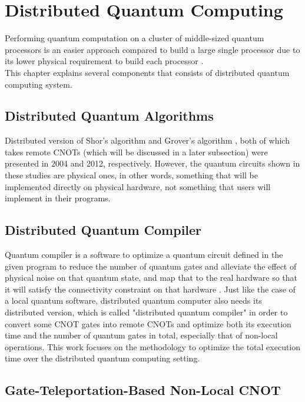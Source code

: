 \newpage

\section{Distributed Quantum Computing}
 
  Performing quantum computation on a cluster of middle-sized quantum processors is an easier approach compared to build a large single processor due to its lower physical requirement to build each processor \cite{distributedquantumcomputing}.  \\
This chapter explains several components that consists of distributed quantum computing system.

\subsection{Distributed Quantum Algorithms}

Distributed version of Shor's algorithm \cite{distributedshor} and Grover's algorithm \cite{distributedgrover}, both of which takes remote CNOTs (which will be discussed in a  later subsection) were presented in 2004 and 2012, respectively. 
However, the quantum circuits shown in these studies are physical ones, in other words, something that will be implemented directly on physical hardware, not something that users will implement in their programs. 

\subsection{Distributed Quantum Compiler}

 Quantum compiler is a software to optimize a quantum circuit defined in the given program to reduce the number of quantum gates and alleviate the effect of physical noise on that quantum state, and map that to the real hardware so that it will satisfy the connectivity constraint on that hardware \cite{qubitallocation}.  Just like the case of a local quantum software, distributed quantum computer also needs its distributed version, which is called "distributed quantum compiler" in order to convert some CNOT gates into remote CNOTs and optimize both its execution time and the number of quantum gates in total, especially that of non-local operations.  This work focuses on the methodology to optimize the total execution time over the distributed quantum computing setting.
 
 \subsection{Gate-Teleportation-Based Non-Local CNOT}
 
